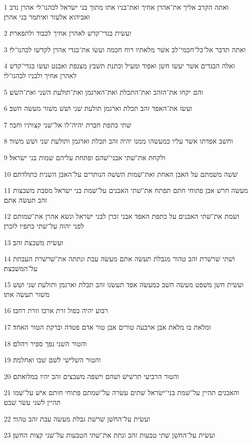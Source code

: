 \par 1 ואתה הקרב אליך את־אהרן אחיך ואת־בניו אתו מתוך בני ישׂראל לכהנו־לי אהרן נדב ואביהוא אלעזר ואיתמר בני אהרן׃
\par 2 ועשׂית בגדי־קדשׁ לאהרן אחיך לכבוד ולתפארת׃
\par 3 ואתה תדבר אל־כל־חכמי־לב אשׁר מלאתיו רוח חכמה ועשׂו את־בגדי אהרן לקדשׁו לכהנו־לי׃
\par 4 ואלה הבגדים אשׁר יעשׂו חשׁן ואפוד ומעיל וכתנת תשׁבץ מצנפת ואבנט ועשׂו בגדי־קדשׁ לאהרן אחיך ולבניו לכהנו־לי׃
\par 5 והם יקחו את־הזהב ואת־התכלת ואת־הארגמן ואת־תולעת השׁני ואת־השׁשׁ׃
\par 6 ועשׂו את־האפד זהב תכלת וארגמן תולעת שׁני ושׁשׁ משׁזר מעשׂה חשׁב׃
\par 7 שׁתי כתפת חברת יהיה־לו אל־שׁני קצותיו וחבר׃
\par 8 וחשׁב אפדתו אשׁר עליו כמעשׂהו ממנו יהיה זהב תכלת וארגמן ותולעת שׁני ושׁשׁ משׁזר׃
\par 9 ולקחת את־שׁתי אבני־שׁהם ופתחת עליהם שׁמות בני ישׂראל׃
\par 10 שׁשׁה משׁמתם על האבן האחת ואת־שׁמות השׁשׁה הנותרים על־האבן השׁנית כתולדתם׃
\par 11 מעשׂה חרשׁ אבן פתוחי חתם תפתח את־שׁתי האבנים על־שׁמת בני ישׂראל מסבת משׁבצות זהב תעשׂה אתם׃
\par 12 ושׂמת את־שׁתי האבנים על כתפת האפד אבני זכרן לבני ישׂראל ונשׂא אהרן את־שׁמותם לפני יהוה על־שׁתי כתפיו לזכרן׃
\par 13 ועשׂית משׁבצת זהב׃
\par 14 ושׁתי שׁרשׁרת זהב טהור מגבלת תעשׂה אתם מעשׂה עבת ונתתה את־שׁרשׁרת העבתת על־המשׁבצת׃
\par 15 ועשׂית חשׁן משׁפט מעשׂה חשׁב כמעשׂה אפד תעשׂנו זהב תכלת וארגמן ותולעת שׁני ושׁשׁ משׁזר תעשׂה אתו׃
\par 16 רבוע יהיה כפול זרת ארכו וזרת רחבו׃
\par 17 ומלאת בו מלאת אבן ארבעה טורים אבן טור אדם פטדה וברקת הטור האחד׃
\par 18 והטור השׁני נפך ספיר ויהלם׃
\par 19 והטור השׁלישׁי לשׁם שׁבו ואחלמה׃
\par 20 והטור הרביעי תרשׁישׁ ושׁהם וישׁפה משׁבצים זהב יהיו במלואתם׃
\par 21 והאבנים תהיין על־שׁמת בני־ישׂראל שׁתים עשׂרה על־שׁמתם פתוחי חותם אישׁ על־שׁמו תהיין לשׁני עשׂר שׁבט׃
\par 22 ועשׂית על־החשׁן שׁרשׁת גבלת מעשׂה עבת זהב טהור׃
\par 23 ועשׂית על־החשׁן שׁתי טבעות זהב ונתת את־שׁתי הטבעות על־שׁני קצות החשׁן׃
